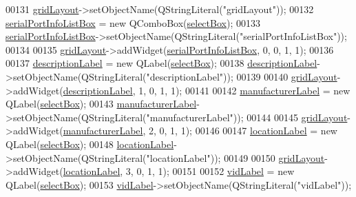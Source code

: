 \begin{DoxyCode}
00131         \hyperlink{a00082_a07d152c7cc63e2cffdda613baea54c0f}{gridLayout}->setObjectName(QStringLiteral(\textcolor{stringliteral}{"gridLayout"}));
00132         \hyperlink{a00082_a323eca0d6d4b94d2d41c7737fe8b2282}{serialPortInfoListBox} = \textcolor{keyword}{new} QComboBox(\hyperlink{a00082_aea3871481f7ecb94f1835e519631f9a2}{selectBox});
00133         \hyperlink{a00082_a323eca0d6d4b94d2d41c7737fe8b2282}{serialPortInfoListBox}->setObjectName(QStringLiteral(\textcolor{stringliteral}{"serialPortInfoListBox"}));
00134 
00135         \hyperlink{a00082_a07d152c7cc63e2cffdda613baea54c0f}{gridLayout}->addWidget(\hyperlink{a00082_a323eca0d6d4b94d2d41c7737fe8b2282}{serialPortInfoListBox}, 0, 0, 1, 1);
00136 
00137         \hyperlink{a00082_aaf2756662f744e79aa3443f1e035870d}{descriptionLabel} = \textcolor{keyword}{new} QLabel(\hyperlink{a00082_aea3871481f7ecb94f1835e519631f9a2}{selectBox});
00138         \hyperlink{a00082_aaf2756662f744e79aa3443f1e035870d}{descriptionLabel}->setObjectName(QStringLiteral(\textcolor{stringliteral}{"descriptionLabel"}));
00139 
00140         \hyperlink{a00082_a07d152c7cc63e2cffdda613baea54c0f}{gridLayout}->addWidget(\hyperlink{a00082_aaf2756662f744e79aa3443f1e035870d}{descriptionLabel}, 1, 0, 1, 1);
00141 
00142         \hyperlink{a00082_afeadc7657c9eaa3103bd529342f5fe97}{manufacturerLabel} = \textcolor{keyword}{new} QLabel(\hyperlink{a00082_aea3871481f7ecb94f1835e519631f9a2}{selectBox});
00143         \hyperlink{a00082_afeadc7657c9eaa3103bd529342f5fe97}{manufacturerLabel}->setObjectName(QStringLiteral(\textcolor{stringliteral}{"manufacturerLabel"}));
00144 
00145         \hyperlink{a00082_a07d152c7cc63e2cffdda613baea54c0f}{gridLayout}->addWidget(\hyperlink{a00082_afeadc7657c9eaa3103bd529342f5fe97}{manufacturerLabel}, 2, 0, 1, 1);
00146 
00147         \hyperlink{a00082_ad860892f11a79cb726643d3478078fcd}{locationLabel} = \textcolor{keyword}{new} QLabel(\hyperlink{a00082_aea3871481f7ecb94f1835e519631f9a2}{selectBox});
00148         \hyperlink{a00082_ad860892f11a79cb726643d3478078fcd}{locationLabel}->setObjectName(QStringLiteral(\textcolor{stringliteral}{"locationLabel"}));
00149 
00150         \hyperlink{a00082_a07d152c7cc63e2cffdda613baea54c0f}{gridLayout}->addWidget(\hyperlink{a00082_ad860892f11a79cb726643d3478078fcd}{locationLabel}, 3, 0, 1, 1);
00151 
00152         \hyperlink{a00082_a50c8fdd36faae6146740e37728af71f2}{vidLabel} = \textcolor{keyword}{new} QLabel(\hyperlink{a00082_aea3871481f7ecb94f1835e519631f9a2}{selectBox});
00153         \hyperlink{a00082_a50c8fdd36faae6146740e37728af71f2}{vidLabel}->setObjectName(QStringLiteral(\textcolor{stringliteral}{"vidLabel"}));

\end{DoxyCode}
